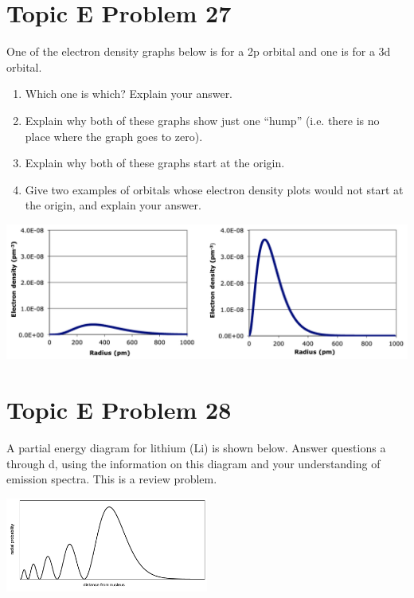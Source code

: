 \documentclass[10pt]{article}
\begin{document}
    \pagebreak
    \section{Topic E Problem 27}
        One of the electron density graphs below is for a 2p orbital and one is for a 3d orbital.
        \begin{enumerate}[label=\alph*)]
            \item   Which one is which? Explain your answer.
            \item   Explain why both of these graphs show just one “hump” (i.e. there is no place where the graph goes to zero).
            \item   Explain why both of these graphs start at the origin.
            \item   Give two examples of orbitals whose electron density plots would not start at the origin, and explain your answer.
        \end{enumerate}
        \begin{center}
            \includegraphics[width=\textwidth]{img-E27.png}
        \end{center}

    \pagebreak
    \section{Topic E Problem 28}
        A partial energy diagram for lithium (Li) is shown below. 
        Answer questions a through d, using the information on this diagram and your understanding of emission spectra. 
        This is a review problem.
        \begin{center}
            \includegraphics[width=0.5\textwidth]{img-E26.png}
        \end{center}
\end{document}
